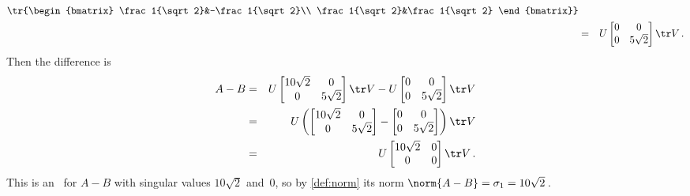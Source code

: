 \begin{example}
\begin{enumerate}
\begin{enumerate}
\begin{solution}
\begin{eqnarray*}
\tr{\begin{bmatrix} \frac1{\sqrt2}&-\frac1{\sqrt2}\\ \frac1{\sqrt2}&\frac1{\sqrt2} \end{bmatrix}}
\\&=&U\begin{bmatrix} 0&0\\0&5\sqrt2 \end{bmatrix}\tr V\,.
\end{eqnarray*}
Then the difference is
\begin{eqnarray*}
A-B&=&U\begin{bmatrix} 10\sqrt2&0\\0&5\sqrt2 \end{bmatrix}\tr V
-U\begin{bmatrix} 0&0\\0&5\sqrt2 \end{bmatrix}\tr V
\\&=&U\left(\begin{bmatrix} 10\sqrt2&0\\0&5\sqrt2 \end{bmatrix}
-\begin{bmatrix} 0&0\\0&5\sqrt2 \end{bmatrix}\right)\tr V
\\&=&U\begin{bmatrix} 10\sqrt2&0\\0&0 \end{bmatrix}\tr V\,.
\end{eqnarray*}
This is an \svd\ for \(A-B\) with singular values \(10\sqrt2\) and~\(0\), so by \cref{def:norm} its norm \(\norm{A-B}=\sigma_1=10\sqrt2\)\,.
\end{solution}


\end{enumerate}
\end{enumerate}
\end{example}
